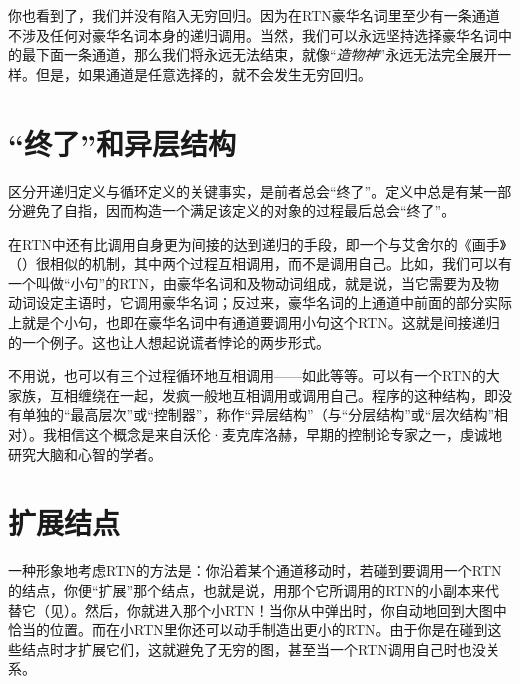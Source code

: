 你也看到了，我们并没有陷入无穷回归。因为在RTN豪华名词里至少有一条通道不涉及任何对豪华名词本身的递归调用。当然，我们可以永远坚持选择豪华名词中的最下面一条通道，那么我们将永远无法结束，就像“\emph{造物神}”永远无法完全展开一样。但是，如果通道是任意选择的，就不会发生无穷回归。

\section{“终了”和异层结构}

区分开递归定义与循环定义的关键事实，是前者总会“终了”。定义中总是有某一部分避免了自指，因而构造一个满足该定义的对象的过程最后总会“终了”。

在RTN中还有比调用自身更为间接的达到递归的手段，即一个与艾舍尔的《画手》（）很相似的机制，其中两个过程互相调用，而不是调用自己。比如，我们可以有一个叫做“小句”的RTN，由豪华名词和及物动词组成，就是说，当它需要为及物动词设定主语时，它调用豪华名词；反过来，豪华名词的上通道中前面的部分实际上就是个小句，也即在豪华名词中有通道要调用小句这个RTN。这就是间接递归的一个例子。这也让人想起说谎者悖论的两步形式。

不用说，也可以有三个过程循环地互相调用——如此等等。可以有一个RTN的大家族，互相缠绕在一起，发疯一般地互相调用或调用自己。程序的这种结构，即没有单独的“最高层次”或“控制器”，称作“异层结构”（与“分层结构”或“层次结构”相对）。我相信这个概念是来自沃伦·麦克库洛赫，早期的控制论专家之一，虔诚地研究大脑和心智的学者。

\section{扩展结点}

一种形象地考虑RTN的方法是：你沿着某个通道移动时，若碰到要调用一个RTN的结点，你便“扩展”那个结点，也就是说，用那个它所调用的RTN的小副本来代替它（见）。然后，你就进入那个小RTN！当你从中弹出时，你自动地回到大图中恰当的位置。而在小RTN里你还可以动手制造出更小的RTN。由于你是在碰到这些结点时才扩展它们，这就避免了无穷的图，甚至当一个RTN调用自己时也没关系。

